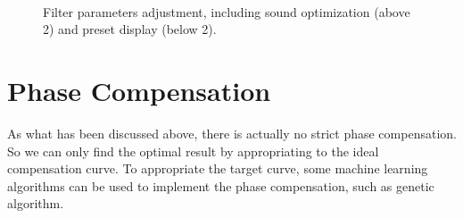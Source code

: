 \documentclass[a4paper]{tufte-handout} %
\begin{document}
\begin{figure}[h!]
    \centering
    \\
    \caption{Filter parameters adjustment, including sound optimization (above 2) and preset display (below 2).}
\end{figure}

\section{Phase Compensation}
As what has been discussed above, there is actually no strict phase compensation. So we can only find the optimal result by appropriating to the ideal compensation curve. To appropriate the target curve, some machine learning algorithms can be used to implement the phase compensation, such as genetic algorithm. 
\end{document}
